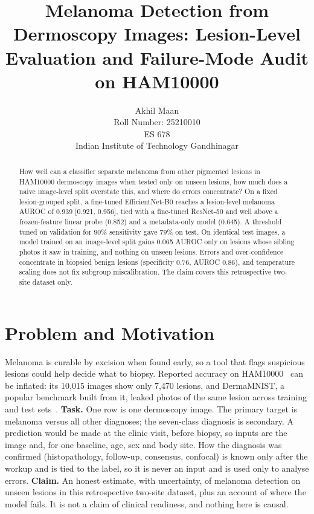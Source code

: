 \documentclass{article}
\title{Melanoma Detection from Dermoscopy Images: Lesion-Level Evaluation and Failure-Mode Audit on HAM10000}
\author{%
  Akhil Maan \\
  Roll Number: 25210010 \\
  ES 678 \\
  Indian Institute of Technology Gandhinagar
}
\begin{document}
\maketitle

\begin{abstract}
How well can a classifier separate melanoma from other pigmented lesions in HAM10000 dermoscopy images
when tested only on unseen lesions, how much does a naive image-level split overstate this, and where
do errors concentrate? On a fixed lesion-grouped split, a fine-tuned EfficientNet-B0 reaches a
lesion-level melanoma AUROC of 0.939 [0.921, 0.956], tied with a fine-tuned ResNet-50 and well above a
frozen-feature linear probe (0.852) and a metadata-only model (0.645). A threshold tuned on validation
for 90\% sensitivity gave 79\% on test. On identical test images, a model trained on an image-level
split gains 0.065 AUROC only on lesions whose sibling photos it saw in training, and nothing on unseen
lesions. Errors and over-confidence concentrate in biopsied benign lesions (specificity 0.76, AUROC
0.86), and temperature scaling does not fix subgroup miscalibration. The claim covers this
retrospective two-site dataset only.
\end{abstract}

\section{Problem and Motivation}
Melanoma is curable by excision when found early, so a tool that flags suspicious lesions could help
decide what to biopsy. Reported accuracy on
HAM10000~\citep{tschandl2018} can be inflated: its 10{,}015 images show only 7{,}470 lesions, and
DermaMNIST, a popular benchmark built from it, leaked photos of the same lesion across training and
test sets~\citep{abhishek2025}.
\textbf{Task.} One row is one dermoscopy image. The primary target is melanoma versus all other
diagnoses; the seven-class diagnosis is secondary. A prediction would be made at the clinic visit,
before biopsy, so inputs are the image and, for one baseline, age, sex and body site. How the
diagnosis was confirmed (histopathology, follow-up, consensus, confocal) is known only after the workup
and is tied to the label, so it is never an input and is used only to analyse errors.
\textbf{Claim.} An honest estimate, with uncertainty, of melanoma detection on unseen lesions in this
retrospective two-site dataset, plus an account of where the model fails. It is not a claim of
clinical readiness, and nothing here is causal.
\end{document}
